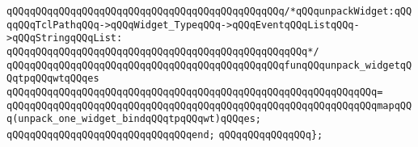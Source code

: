 \newline
\newline
\newline
\verb|qQQqqQQqqQQqqQQqqQQqqQQqqQQqqQQqqQQqqQQqqQQqqQQq/*qQQqunpackWidget:qQQqqQQqTclPathqQQq->qQQqWidget_TypeqQQq->qQQqEventqQQqListqQQq->qQQqStringqQQqList:|\newline
\verb|qQQqqQQqqQQqqQQqqQQqqQQqqQQqqQQqqQQqqQQqqQQqqQQqqQQq*/|\newline
\verb|qQQqqQQqqQQqqQQqqQQqqQQqqQQqqQQqqQQqqQQqqQQqqQQqfunqQQqunpack_widgetqQQqtpqQQqwtqQQqes|\newline
\verb|qQQqqQQqqQQqqQQqqQQqqQQqqQQqqQQqqQQqqQQqqQQqqQQqqQQqqQQqqQQqqQQq=|\newline
\verb|qQQqqQQqqQQqqQQqqQQqqQQqqQQqqQQqqQQqqQQqqQQqqQQqqQQqqQQqqQQqqQQqmapqQQq(unpack_one_widget_bindqQQqtpqQQqwt)qQQqes;|\newline
\verb|qQQqqQQqqQQqqQQqqQQqqQQqqQQqqQQqend;|\newline
\newline
\verb|qQQqqQQqqQQqqQQq};|\newline
\newline

